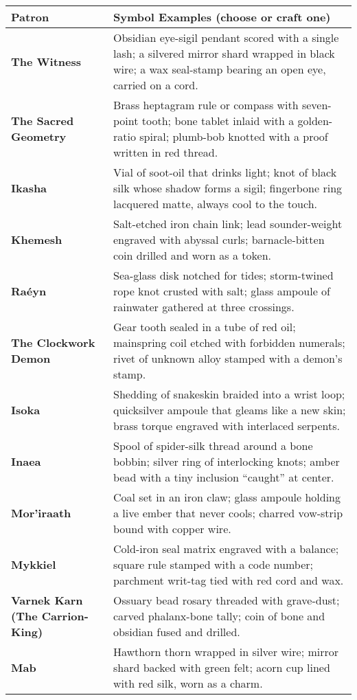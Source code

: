 \documentclass[12pt,twoside]{book}
\begin{document}
\begin{table}[htbp]
\centering
\small
\renewcommand{\arraystretch}{1.15}
\begin{tabular}{>{\bfseries}p{4.0cm} >{\raggedright\arraybackslash}p{10.8cm}}
\toprule
\textbf{Patron} & \textbf{Symbol Examples (choose or craft one)} \\
\midrule
The Witness & Obsidian eye-sigil pendant scored with a single lash; a silvered mirror shard wrapped in black wire; a wax seal-stamp bearing an open eye, carried on a cord. \\
The Sacred Geometry & Brass heptagram rule or compass with seven-point tooth; bone tablet inlaid with a golden-ratio spiral; plumb-bob knotted with a proof written in red thread. \\
Ikasha & Vial of soot-oil that drinks light; knot of black silk whose shadow forms a sigil; fingerbone ring lacquered matte, always cool to the touch. \\
Khemesh & Salt-etched iron chain link; lead sounder-weight engraved with abyssal curls; barnacle-bitten coin drilled and worn as a token. \\
Raéyn & Sea-glass disk notched for tides; storm-twined rope knot crusted with salt; glass ampoule of rainwater gathered at three crossings. \\
The Clockwork Demon & Gear tooth sealed in a tube of red oil; mainspring coil etched with forbidden numerals; rivet of unknown alloy stamped with a demon’s stamp. \\
Isoka & Shedding of snakeskin braided into a wrist loop; quicksilver ampoule that gleams like a new skin; brass torque engraved with interlaced serpents. \\
Inaea & Spool of spider-silk thread around a bone bobbin; silver ring of interlocking knots; amber bead with a tiny inclusion “caught” at center. \\
Mor'iraath & Coal set in an iron claw; glass ampoule holding a live ember that never cools; charred vow-strip bound with copper wire. \\
Mykkiel & Cold-iron seal matrix engraved with a balance; square rule stamped with a code number; parchment writ-tag tied with red cord and wax. \\
Varnek Karn (The Carrion-King) & Ossuary bead rosary threaded with grave-dust; carved phalanx-bone tally; coin of bone and obsidian fused and drilled. \\
Mab & Hawthorn thorn wrapped in silver wire; mirror shard backed with green felt; acorn cup lined with red silk, worn as a charm. \\

\end{tabular}
\end{table}
\end{document}
